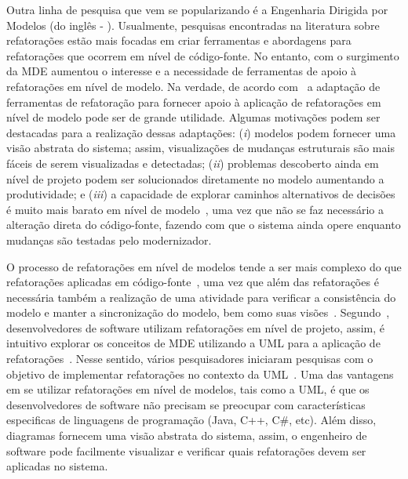 Outra linha de pesquisa que vem se popularizando é a Engenharia Dirigida por Modelos (do inglês - ). Usualmente, pesquisas encontradas na literatura sobre refatorações estão mais focadas em criar ferramentas e abordagens para refatorações que ocorrem em nível de código-fonte. No entanto, com o surgimento da MDE aumentou o interesse e a necessidade de ferramentas de apoio à refatorações em nível de modelo. Na verdade, de acordo com~ a adaptação de ferramentas de refatoração para fornecer apoio à aplicação de refatorações em nível de modelo pode ser de grande utilidade. Algumas motivações podem ser destacadas para a realização dessas adaptações: (\emph{i}) modelos podem fornecer uma visão abstrata do sistema; assim, visualizações de mudanças estruturais são mais fáceis de serem visualizadas e detectadas; (\emph{ii}) problemas descoberto ainda em nível de projeto podem ser solucionados diretamente no modelo aumentando a produtividade; e (\emph{iii}) a capacidade de explorar caminhos alternativos de decisões é muito mais barato em nível de modelo~\cite{Mens_2006}, uma vez que não se faz necessário a alteração direta do código-fonte, fazendo com que o sistema ainda opere enquanto mudanças são testadas pelo modernizador.


O processo de refatorações em nível de modelos tende a ser mais complexo do que refatorações aplicadas em código-fonte~\cite{Mens_2006}, uma vez que além das refatorações é necessária também a realização de uma atividade para verificar a consistência do modelo e manter a sincronização do modelo, bem como suas visões~\cite{KolahdouzRahimi20145}. Segundo~, desenvolvedores de software utilizam refatorações em nível de projeto, assim, é intuitivo explorar os conceitos de MDE utilizando a UML para a aplicação de refatorações~\cite{Salem_2008, Gorp, Egyed_2008, Briand_2006, staron2004implementing}. Nesse sentido, vários pesquisadores iniciaram pesquisas com o objetivo de implementar refatorações no contexto da UML~\cite{revisao_sistematica_uml_refactoring}. Uma das vantagens em se utilizar refatorações em nível de modelos, tais como a UML, é que os desenvolvedores de software não precisam se preocupar com características especificas de linguagens de programação (Java, C++, C\#, etc). Além disso, diagramas fornecem uma visão abstrata do sistema, assim, o engenheiro de software pode facilmente visualizar e verificar quais refatorações devem ser aplicadas no sistema. 

